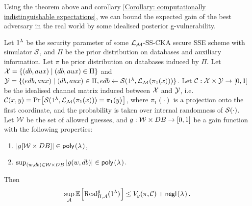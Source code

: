 Using the theorem above and corollary \ref{Corollary: computationally indistinguishable expectations}, we can bound the expected gain of the best adversary in the real world by some idealised posterior g-vulnerability.

\begin{corollary}
	\normalfont
	Let $1^{\lambda}$ be the security parameter of some $\mathcal{L}_\mathcal{M}$-SS-CKA secure SSE scheme with simulator $\mathcal{S}$, and $\Pi$ be the prior distribution on databases and auxiliary information. Let $\pi$ be prior distribution on databases induced by $\Pi$. Let $\mathcal{X} = \{ (db, aux) \mid (db, aux) \in \Pi \}$ and $\mathcal{Y} = \{(edb, aux) \mid (db, aux) \in \Pi, edb \gets \mathcal{S}(1^{\lambda}, \mathcal{L}_\mathcal{M}(\pi_1(x))) \}$. Let $\mathcal{C}: \mathcal{X} \times \mathcal{Y} \rightarrow [0,1]$ be the idealised channel matrix induced between $\mathcal{X}$ and $\mathcal{Y}$, i.e. $\channel(x,y) = \prob{\simer(\secparam, \leakm(\pi_1(x))) = \pi_1(y)}$, where $\pi_1(\cdot)$ is a projection onto the first coordinate, and the probability is taken over internal randomness of $\mathcal{S}(\cdot)$. Let $\mathcal{W}$ be the set of allowed guesses, and $g:\mathcal{W} \times DB \rightarrow [0,1]$ be a gain function with the following properties:
	\begin{enumerate}
		\item $|g[\W \times \DB]| \in \poly$,
		\item $\sup_{(w, \db) \in \W \times \DB} |g(w, \db)| \in \poly$.
	\end{enumerate}
	Then
	\begin{equation*}
	\sup_{\adversary} \expect{\text{Real}_{\Pi, \adversary}^{g}(\secparam)} \leq V_{g}(\pi, \channel) + \negl.
	\end{equation*}
\end{corollary}



